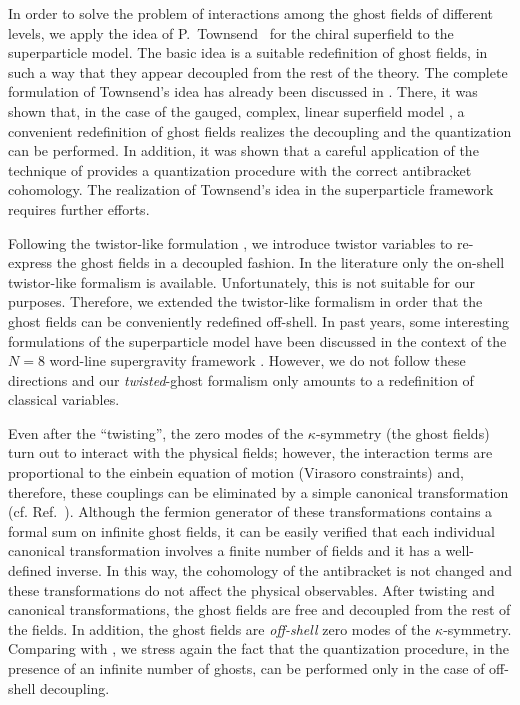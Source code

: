 \documentclass[a4paper,12pt]{article}
\begin{document}
In order to solve the problem of interactions among the ghost fields
of different levels, we apply the idea of P.~Townsend~\cite{3lectures}
for the chiral superfield to the superparticle model.  The basic idea
is a suitable redefinition of ghost fields, in such a way that they
appear decoupled from the rest of the theory. The complete formulation
of Townsend's idea has already been discussed in \cite{poli_1}. There,
it was shown that, in the case of the gauged, complex, linear
superfield model \cite{GPZ}, a convenient redefinition of ghost fields
realizes the decoupling and the quantization can be performed. In
addition, it was shown that a careful application of the technique of
\cite{GPZ} provides a quantization procedure with the correct
antibracket cohomology. The realization of Townsend's idea in the
superparticle framework requires further efforts.

Following the twistor-like formulation \cite{twistor-like}, we
introduce twistor variables to re-express the ghost fields in a
decoupled fashion. In the literature only the on-shell twistor-like
formalism is available.  Unfortunately, this is not suitable for our
purposes. Therefore, we extended the twistor-like formalism in order
that the ghost fields can be conveniently redefined off-shell.  In
past years, some interesting formulations of the superparticle model
have been discussed in the context of the $N=8$ word-line supergravity
framework \cite{twistor-like}. However, we do not follow these
directions and our {\it twisted}-ghost formalism only amounts to a
redefinition of classical variables.

Even after the ``twisting'', the zero modes of the $\kappa$-symmetry
(the ghost fields) turn out to interact with the physical fields;
however, the interaction terms are proportional to the einbein
equation of motion (Virasoro constraints) and, therefore, these
couplings can be eliminated by a simple canonical transformation (cf.
Ref.~\cite{cano}). Although the fermion generator of these
transformations contains a formal sum on infinite ghost fields, it can
be easily verified that each individual canonical transformation
involves a finite number of fields \cite{kallosh,Bastianelli} and it
has a well-defined inverse. In this way, the cohomology of the
antibracket is not changed and these transformations do not affect the
physical observables.
%
After twisting and canonical transformations, the ghost 
fields are free and decoupled from the rest of the fields. In
addition, the ghost fields are {\it off-shell} zero modes of the
$\kappa$-symmetry. Comparing with \cite{poli_1,GPZ}, we stress again
the fact that the quantization procedure, in the presence of an
infinite number of ghosts, can be performed only in the case
of off-shell decoupling.
\end{document}
